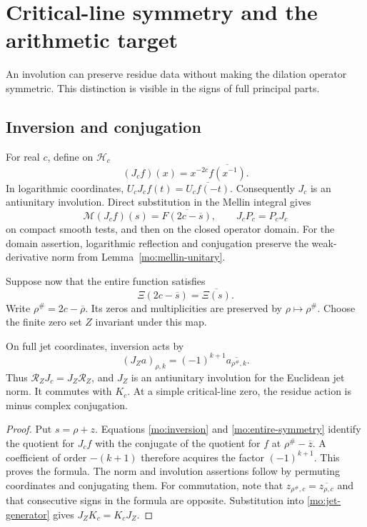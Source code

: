 \chapter{Critical-line symmetry and the arithmetic target}

An involution can preserve residue data without making the dilation
operator symmetric. This distinction is visible in the signs of
full principal parts.

\section{Inversion and conjugation}

For real $c$, define on $\mathscr H_c$
\[
 (J_cf)(x)=x^{-2c}\overline{f(x^{-1})}.
\]
In logarithmic coordinates,
$U_cJ_cf(t)=\overline{U_cf(-t)}$. Consequently $J_c$ is an
antiunitary involution. Direct substitution in the Mellin integral
gives
\begin{equation}
 \mathcal M(J_cf)(s)=\overline{F(2c-\overline s)},
 \qquad J_cP_c=P_cJ_c
 \label{mo:inversion}
\end{equation}
on compact smooth tests, and then on the closed operator domain.
For the domain assertion, logarithmic reflection and conjugation
preserve the weak-derivative norm from
Lemma~\ref{mo:mellin-unitary}.

Suppose now that the entire function satisfies
\begin{equation}
 \Xi(2c-\overline s)=\overline{\Xi(s)}.
 \label{mo:entire-symmetry}
\end{equation}
Write $\rho^\#=2c-\overline\rho$. Its zeros and multiplicities
are preserved by $\rho\mapsto\rho^\#$. Choose the finite zero set
$Z$ invariant under this map.

\begin{proposition}
\label{mo:residue-involution}
On full jet coordinates, inversion acts by
\[
 (J_Za)_{\rho,k}=(-1)^{k+1}\overline{a_{\rho^\#,k}}.
\]
Thus $\mathcal R_ZJ_c=J_Z\mathcal R_Z$, and $J_Z$ is an
antiunitary involution for the Euclidean jet norm. It commutes
with $K_c$. At a simple critical-line zero, the residue action
is minus complex conjugation.
\end{proposition}
\begin{proof}
Put $s=\rho+z$. Equations \eqref{mo:inversion} and
\eqref{mo:entire-symmetry} identify the quotient for $J_cf$ with
the conjugate of the quotient for $f$ at
$\rho^\#-\overline z$. A coefficient of order $-(k+1)$ therefore
acquires the factor $(-1)^{k+1}$. This proves the formula.
The norm and involution assertions follow by permuting coordinates
and conjugating them. For commutation, note that
$z_{\rho^\#,c}=\overline{z_{\rho,c}}$ and that consecutive signs
in the formula are opposite. Substitution into
\eqref{mo:jet-generator} gives $J_ZK_c=K_cJ_Z$.
\end{proof}


